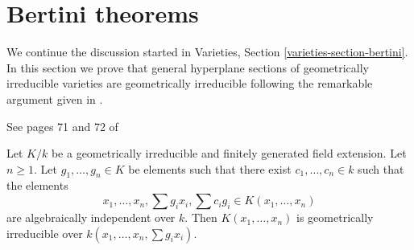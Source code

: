 \section{Bertini theorems}
\label{section-bertini}

\noindent
We continue the discussion started in
Varieties, Section \ref{varieties-section-bertini}.
In this section we prove that general hyperplane sections
of geometrically irreducible varieties are geometrically irreducible
following the remarkable argument given in \cite{Jou}.

\begin{lemma}
\label{lemma-amazing-bertini-lemma}
\begin{reference}
See pages 71 and 72 of \cite{Jou}
\end{reference}
Let $K/k$ be a geometrically irreducible and finitely generated
field extension. Let $n \geq 1$.
Let $g_1, \ldots, g_n \in K$ be elements such that there
exist $c_1, \ldots, c_n \in k$ such that the elements
$$
x_1, \ldots, x_n, \sum g_ix_i, \sum c_ig_i \in K(x_1, \ldots, x_n)
$$
are algebraically independent over $k$. Then
$K(x_1, \ldots, x_n)$ is geometrically irreducible over
$k(x_1, \ldots, x_n, \sum g_ix_i)$.
\end{lemma}

